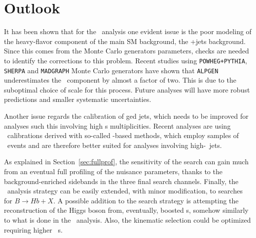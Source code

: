 \section{Outlook}\label{sec:htxOUT}

It has been shown that for the \htx\ analysis one evident issue
is the poor modeling of the
heavy-flavor component of the main SM background, the
\ttbar+jets background.
Since this comes from the Monte Carlo generators parameters, 
checks are needed to identify the corrections to this problem.
Recent studies using \texttt{POWHEG+PYTHIA}, \texttt{SHERPA}
and \texttt{MADGRAPH} Monte Carlo generators have shown that
\texttt{ALPGEN} underestimates the \tthf\ component by
almost a factor of two. This is due to the suboptimal
choice of scale for this process. Future analyses will have
more robust predictions and smaller systematic uncertainties.

Another issue regards the calibration of \btag ged jets,
which needs to be improved for analyses such this involving
high \bjet s multiplicities. Recent analyses are using \btag\ 
calibrations derived with so-called \ttbar-based methods,
which employ samples of \ttbar\ events and are therefore
better suited for analyses involving high-\pt\ jets.

As explained in Section~\ref{sec:fullprof}, 
the sensitivity of the search can gain much from an
eventual full profiling of the nuisance parameters, thanks to the
background-enriched sidebands in the three final search channels.
Finally, the \htx\ analysis strategy can be easily
extended, with minor modification, to searches for $B\to Hb+X$.
A possible addition to the search strategy is attempting
the reconstruction of the Higgs boson from, eventually,
boosted \bjet s, somehow similarly to what is done in the
\wbx\ analysis.
Also, the kinematic selection could be optimized requiring
higher \pt\ \bjet s.
